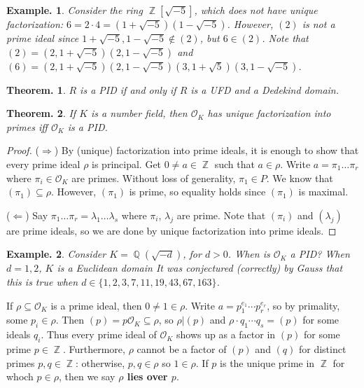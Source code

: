 \documentclass[11pt, a4paper]{memoir}
\DeclareMathOperator{\Q}{{\mathbb{Q}}}
\DeclareMathOperator{\Z}{{\mathbb{Z}}}
\theoremstyle{change}
\newtheorem{theorem}{Theorem.}[section]
\theoremstyle{plain}
\theoremstyle{nonumberplain}
\newtheorem{example}{Example.}
\newtheorem{proof}{Proof}
\begin{document}
\begin{example}
    Consider the ring $\Z[\sqrt{-5}]$, which does not have unique factorization: $6=2\cdot 4=(1+\sqrt{-5})(1-\sqrt{-5})$.
    However, $(2)$ is not a prime ideal since $1+\sqrt{-5},1-\sqrt{-5}\notin(2)$, but $6\in(2)$.
    Note that $(2)=(2,1+\sqrt{-5})(2,1-\sqrt{-5})$ and $(6)=(2,1+\sqrt{-5})(2,1-\sqrt{-5})(3,1+\sqrt{5})(3,1-\sqrt{-5})$.
\end{example}
\begin{theorem}
    $R$ is a PID if and only if $R$ is a UFD and a Dedekind domain.
\end{theorem}
\begin{theorem}
    If $K$ is a number field, then $\mathcal{O}_K$ has unique factorization into primes iff $\mathcal{O}_K$ is a PID.
\end{theorem}
\begin{proof}
    ($\Rightarrow$) By (unique) factorization into prime ideals, it is enough to show that every prime ideal $\rho$ is principal.
    Get $0\neq a\in\Z$ such that $a\in\rho$.
    Write $a=\pi_1\ldots\pi_r$ where $\pi_i\in\mathcal{O}_K$ are primes.
    Without loss of generality, $\pi_1\in P$.
    We know that $(\pi_1)\subseteq\rho$.
    However, $(\pi_1)$ is prime, so equality holds since $(\pi_1)$ is maximal.

    ($\Leftarrow$) Say $\pi_1\ldots\pi_r=\lambda_1\ldots\lambda_s$ where $\pi_i$, $\lambda_j$ are prime.
    Note that $(\pi_i)$ and $(\lambda_j)$ are prime ideals, so we are done by unique factorization into prime ideals.
\end{proof}
\begin{example}
    Consider $K=\Q(\sqrt{-d})$, for $d>0$.
    When is $\mathcal{O}_K$ a PID?
    When $d=1,2$, $K$ is a Euclidean domain
    It was conjectured (correctly) by Gauss that this is true when $d\in\{1,2,3,7,11,19,43,67,163\}$.
\end{example}
If $\rho\subseteq\mathcal{O}_K$ is a prime ideal, then $0\neq 1\in\rho$.
Write $a=p_1^{e_1}\cdots p_r^{e_r}$, so by primality, some $p_i\in\rho$.
Then $(p)=p\mathcal{O}_K\subseteq\rho$, so $\rho|(p)$ and $\rho\cdot q_1\cdots q_s=(p)$ for some ideals $q_i$.
Thus every prime ideal of $\mathcal{O}_K$ shows up as a factor in $(p)$ for some prime $p\in\Z$.
Furthermore, $\rho$ cannot be a factor of $(p)$ and $(q)$ for distinct primes $p,q\in\Z$: otherwise, $p,q\in\rho$ so $1\in\rho$.
If $p$ is the unique prime in $\Z$ for whoch $p\in\rho$, then we say \textbf{$\rho$ lies over $p$}.
\end{document}
